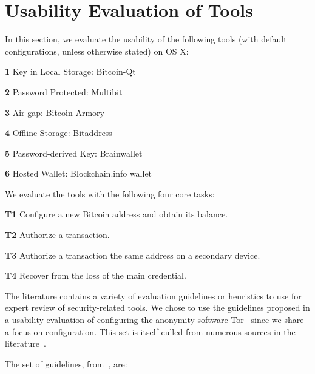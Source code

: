 
\section{Usability Evaluation of Tools}

In this section, we evaluate the usability of the following tools (with default configurations, unless otherwise stated) on OS X:

\begin{compactlist}
	\item[\bf 1] Key in Local Storage: Bitcoin-Qt
	\item[\bf 2] Password Protected: Multibit 
	\item[\bf 3] Air gap: Bitcoin Armory
	\item[\bf 4] Offline Storage: Bitaddress
	\item[\bf 5] Password-derived Key: Brainwallet
	\item[\bf 6] Hosted Wallet: Blockchain.info wallet
\end{compactlist}

We evaluate the tools with the following four core tasks:

\begin{compactlist}
	\item[\bf T1] Configure a new Bitcoin address and obtain its balance.\label{sec:ct-1}
	\item[\bf T2] Authorize a transaction.\label{sec:ct-2}
	\item[\bf T3] Authorize a transaction the same address on a secondary device.\label{sec:ct-3}
	\item[\bf T4] Recover from the loss of the main credential.\label{sec:ct-4}
\end{compactlist}

The literature contains a variety of evaluation guidelines or heuristics to use for expert review of security-related tools. We chose to use the guidelines proposed in a usability evaluation of configuring the anonymity software Tor~\cite{COA07} since we share a focus on configuration. This set is itself culled from numerous sources in the literature~\cite{WRLP94,WT99,Cra03,KBK05,COB06}.

The set of guidelines, from~\cite{COA07}, are:
	
